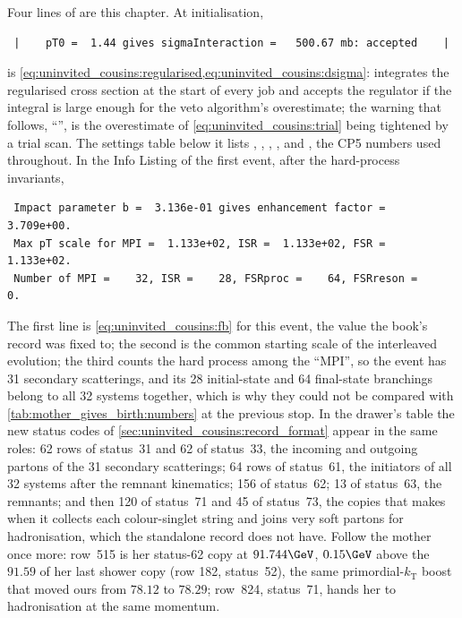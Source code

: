 Four lines of  are this chapter. At
initialisation,
\begin{verbatim}
 |    pT0 =  1.44 gives sigmaInteraction =   500.67 mb: accepted    |
\end{verbatim}
is \cref{eq:uninvited_cousins:regularised,eq:uninvited_cousins:dsigma}: \PYTHIA
integrates the regularised cross section at the start of every job and
accepts the regulator if the integral is large enough for the veto
algorithm's overestimate; the warning that follows,
``'',
is the overestimate of \cref{eq:uninvited_cousins:trial} being tightened
by a trial scan. The settings table below it lists ,
, , ,
 and , the CP5
numbers used throughout. In the Info Listing of the first event, after the
hard-process invariants,
\begin{verbatim}
 Impact parameter b =  3.136e-01 gives enhancement factor =  3.709e+00.
 Max pT scale for MPI =  1.133e+02, ISR =  1.133e+02, FSR =  1.133e+02.
 Number of MPI =    32, ISR =    28, FSRproc =    64, FSRreson =     0.
\end{verbatim}
The first line is \cref{eq:uninvited_cousins:fb} for this event, the value
the book's record was fixed to; the second is the common starting scale of
the interleaved evolution; the third counts the hard process among the
``MPI'', so the event has 31 secondary scatterings, and its 28 initial-state
and 64 final-state branchings belong to all 32 systems together, which is
why they could not be compared with \cref{tab:mother_gives_birth:numbers}
at the previous stop. In the drawer's table the new status codes of
\cref{sec:uninvited_cousins:record_format} appear in the same roles: 62
rows of status~31 and 62 of status~33, the incoming and outgoing partons of
the 31 secondary scatterings; 64 rows of status~61, the initiators of all
32 systems after the remnant kinematics; 156 of status~62; 13 of status~63,
the remnants; and then 120 of status~71 and 45 of status~73, the copies
that \PYTHIA makes when it collects each colour-singlet string and joins
very soft partons for hadronisation, which the standalone record does not
have. Follow the mother once more: row~515 is her status-62 copy at
$91.744\GeV$, $0.15\GeV$ above the $91.59$ of her last shower copy (row 182,
status~52), the same primordial-$k_{\mathrm{T}}$ boost that moved ours from
$78.12$ to $78.29$; row~824, status~71, hands her to hadronisation at the
same momentum.

